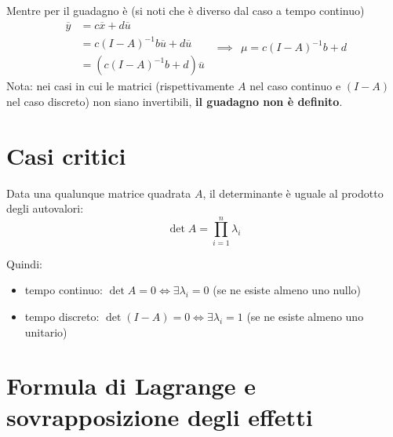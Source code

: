 Mentre per il guadagno è (si noti che è diverso dal caso a tempo continuo)
\begin{equation*}
	\begin{aligned}
		\overline{y} & =c\overline{x} +d\overline{u}               \\
		             & =c(I-A)^{-1} b\overline{u} +d\overline{u}  \\
		             & =\left(c(I-A)^{-1} b+d\right)\overline{u} 
	\end{aligned} \ \ \implies \ \ \boxed{\mu =c(I-A)^{-1} b+d}
\end{equation*}
Nota: nei casi in cui le matrici (rispettivamente $A$ nel caso continuo e $(I-A)$ nel caso discreto) non siano invertibili, \textbf{il guadagno non è definito}.

\section{Casi critici}

\begin{rem}
	Data una qualunque matrice quadrata $A$, il determinante è uguale al prodotto degli autovalori:
	\begin{equation*}
		\det A=\prod ^n_{i=1} \lambda _i
	\end{equation*}
\end{rem}
Quindi:
\begin{itemize}
	\item tempo continuo: $\det A=0\iff \exists \lambda _i =0$ (se ne esiste almeno uno nullo)
	\item tempo discreto: $\det(I-A) =0\iff \exists \lambda _i =1$ (se ne esiste almeno uno unitario)
\end{itemize}

\section{Formula di Lagrange e sovrapposizione degli effetti}


